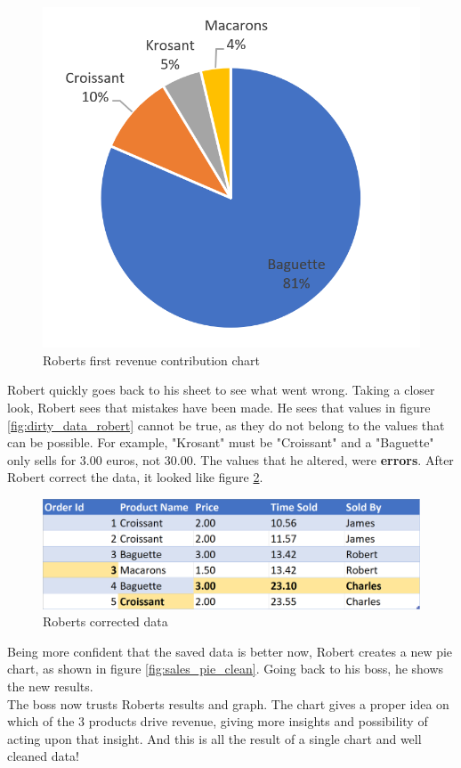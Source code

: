\begin{figure}[h]
    \centering
    \includegraphics[width=0.5\linewidth]{thesis/Figures/Sales_Pie_Dirty.png}
    \caption{Roberts first revenue contribution chart}
    \label{fig:sales_pie_dirty}
\end{figure}

Robert quickly goes back to his sheet to see what went wrong. Taking a closer look, Robert sees that mistakes have been made. He sees that values in figure \ref{fig:dirty_data_robert} cannot be true, as they do not belong to the values that can be possible. For example, "Krosant" must be "Croissant" and a "Baguette" only sells for 3.00 euros, not 30.00. The values that he altered, were \textbf{errors}. After Robert correct the data, it looked like figure \ref{fig:clean_data_robert}.

\begin{figure}[h]
    \centering
    \includegraphics[width=0.9\linewidth]{thesis/Figures/CleanDataset.png}
    \caption{Roberts corrected data}
    \label{fig:clean_data_robert}
\end{figure}

Being more confident that the saved data is better now, Robert creates a new pie chart, as shown in figure \ref{fig:sales_pie_clean}. Going back to his boss, he shows the new results. 
~\\The boss now trusts Roberts results and graph. The chart gives a proper idea on which of the 3 products drive revenue, giving more insights and possibility of acting upon that insight.
And this is all the result of a single chart and well cleaned data!

